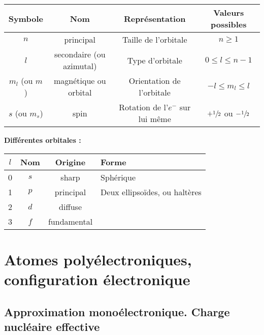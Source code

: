 \documentclass[13pt, twoside, a4paper, french, tikz]{report}
\begin{document}
    \begin{tabular}{|c|c|c|c|}
      \hline
      \textbf{Symbole} & \textbf{Nom}             & \textbf{Représentation}          & \textbf{Valeurs possibles}         \\\hline
      $n$              & principal                & Taille de l'orbitale             & $n \ge 1$                          \\\hline
      $l$              & secondaire (ou azimutal) & Type d'orbitale                  & $0 \le l \le n-1$                  \\\hline
      $m_l$ (ou $m$)   & magnétique ou orbital    & Orientation de l'orbitale        & $-l \le m_l \le l$                 \\\hline
      $s$ (ou $m_s$)   & spin                     & Rotation de l'$e^-$ sur lui même & $+\sfrac{1}{2}$ ou $-\sfrac{1}{2}$ \\\hline
    \end{tabular}\label{tab:table}
    
    \vspace{7pt}
    \textbf{Différentes orbitales :}
    \vspace{7pt}
    
    \begin{tabular}{|c|c|c|l|}
      \hline
      \textbf{$l$} & \textbf{Nom} & \textbf{Origine} & \textbf{Forme}                \\\hline
      0            & $s$          & sharp            & Sphérique                     \\\hline
      1            & $p$          & principal        & Deux ellipsoïdes, ou haltères \\\hline
      2            & $d$          & diffuse          &                               \\\hline
      3            & $f$          & fundamental      &                               \\\hline
    \end{tabular}


\chapter{Atomes polyélectroniques,\\configuration électronique}\label{ch:atomes-polyelectroniques---configuration-electronique}
  
  
  \section{Approximation monoélectronique. Charge nucléaire effective}\label{sec:approximation-monoelectronique.-charge-nucleaire-effective}
    
\end{document}
